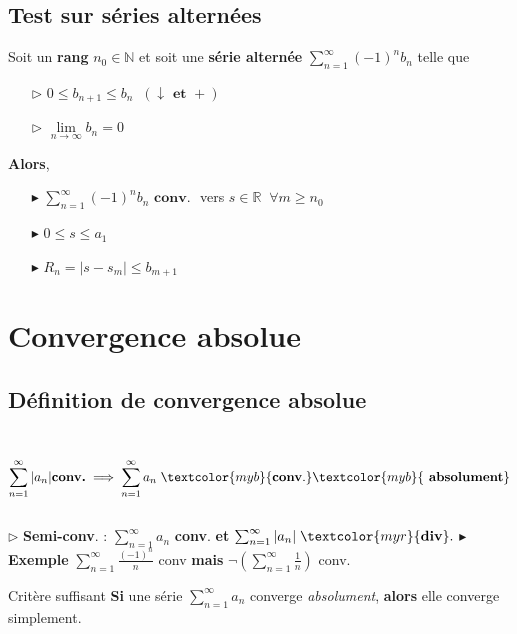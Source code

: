 \documentclass{report}
\begin{document}
\begin{multicols*}{3}
     \section{Test sur séries alternées}
     Soit un \textbf{rang} $n_0 \in \mathbb{N}$ et 
     soit une \textbf{série alternée} 
     $\sum_{n=1}^{\infty } (-1)^nb_n$ telle que 
     \begin{itemize}
       \item [$\rhd$ ]  $0 \leq b_{n+1} \leq b_n \;\;(\downarrow \textbf{ et } +)$ 
       \item [$\rhd$ ] $\lim\limits_{n\to\infty }b_n = 0$ 
     \end{itemize}
     \textbf{Alors}, 
     \begin{itemize}
        \item[$\blacktriangleright$]
        $\sum_{n=1}^{\infty }  (-1)^nb_n \textbf{ conv. }$ vers $s \in
    \mathbb{R} \;\; \forall m \geq n_0 $ 
        \item[$\blacktriangleright$]
    $0 \leq s \leq a_1$ 
        \item[$\blacktriangleright$] 
    $R_n = |s - s_m| \leq b_{m+1}$
     \end{itemize}

\chapter{Convergence absolue}
    \section{Définition de convergence absolue}
    \mbox{}\\
     \[%
        \sum_{n=1}^{\infty }|a_n| \textbf{conv.} \implies 
        \sum_{n=1}^{\infty }a_n \; \textcolor{myb}{\textbf{conv}.} \textcolor{myb}{\textbf{ absolument}}  
     \]%
      \\
      $\rhd$  \textbf{Semi-conv}. : $\sum_{n=1}^{\infty }a_n$ \textbf{conv}. \; 
         \textbf{et} $\sum_{n=1}^{\infty }|a_n| \; \textcolor{myr}{\textbf{div}}.$ 
      $\blacktriangleright$  \textbf{Exemple} $\sum_{n=1}^{\infty }\frac{(-1)^n}{n}$ conv 
          \textbf{mais} $\neg(\sum_{n=1}^{\infty }\frac{1}{n})$ conv.  

    \begin{theorem}{Critère suffisant}{}
       \textbf{Si} une série $\sum_{n=1}^{\infty }a_n$ converge \textit{absolument}, 
       \textbf{alors} elle converge simplement.  
    \end{theorem}


\end{multicols*}
\end{document}
